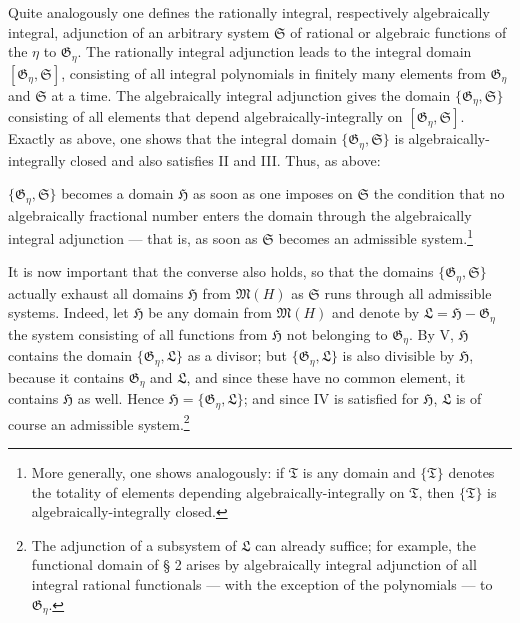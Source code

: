 \documentclass[11pt]{article}
\begin{document}
Quite analogously one defines the rationally integral, respectively
algebraically integral, adjunction of an arbitrary system $\mathfrak S$ of
rational or algebraic functions of the $\eta$ to $\mathfrak G_\eta$. The
rationally integral adjunction leads to the integral domain
$[\mathfrak G_\eta,\mathfrak S]$, consisting of all integral polynomials in
finitely many elements from $\mathfrak G_\eta$ and $\mathfrak S$ at a time. The
algebraically integral adjunction gives the domain
$\{\mathfrak G_\eta,\mathfrak S\}$ consisting of all elements that depend
algebraically-integrally on $[\mathfrak G_\eta,\mathfrak S]$. Exactly as above,
one shows that the integral domain $\{\mathfrak G_\eta,\mathfrak S\}$ is
algebraically-integrally closed and also satisfies II and III. Thus, as above:

$\{\mathfrak G_\eta,\mathfrak S\}$ becomes a domain $\mathfrak H$ as soon as one
imposes on $\mathfrak S$ the condition that no algebraically fractional number
enters the domain through the algebraically integral adjunction --- that is, as
soon as $\mathfrak S$ becomes an admissible system.\footnote{More generally, one
shows analogously: if $\mathfrak T$ is any domain and $\{\mathfrak T\}$ denotes
the totality of elements depending algebraically-integrally on $\mathfrak T$,
then $\{\mathfrak T\}$ is algebraically-integrally closed.}

It is now important that the converse also holds, so that the domains
$\{\mathfrak G_\eta,\mathfrak S\}$ actually exhaust all domains $\mathfrak H$
from $\mathfrak M(H)$ as $\mathfrak S$ runs through all admissible systems.
Indeed, let $\mathfrak H$ be any domain from $\mathfrak M(H)$ and denote by
$\mathfrak L=\mathfrak H-\mathfrak G_\eta$ the system consisting of all functions
from $\mathfrak H$ not belonging to $\mathfrak G_\eta$. By V, $\mathfrak H$
contains the domain $\{\mathfrak G_\eta,\mathfrak L\}$ as a divisor; but
$\{\mathfrak G_\eta,\mathfrak L\}$ is also divisible by $\mathfrak H$, because
it contains $\mathfrak G_\eta$ and $\mathfrak L$, and since these have no common
element, it contains $\mathfrak H$ as well. Hence
$\mathfrak H=\{\mathfrak G_\eta,\mathfrak L\}$; and since IV is satisfied for
$\mathfrak H$, $\mathfrak L$ is of course an admissible system.\footnote{The
adjunction of a subsystem of $\mathfrak L$ can already suffice; for example, the
functional domain of § 2 arises by algebraically integral adjunction of all
integral rational functionals --- with the exception of the polynomials --- to
$\mathfrak G_\eta$.}
\end{document}
